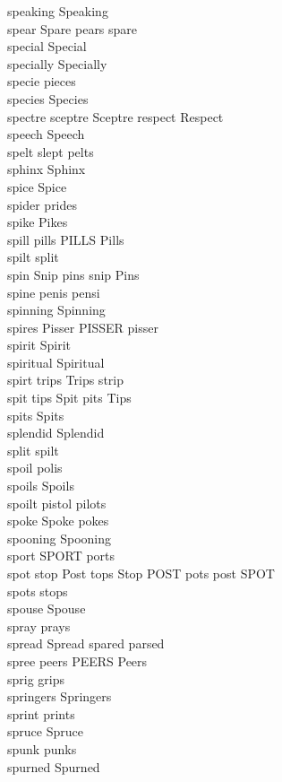 speaking Speaking\\
spear Spare pears spare\\
special Special\\
specially Specially\\
specie pieces\\
species Species\\
spectre sceptre Sceptre respect Respect\\
speech Speech\\
spelt slept pelts\\
sphinx Sphinx\\
spice Spice\\
spider prides\\
spike Pikes\\
spill pills PILLS Pills\\
spilt split\\
spin Snip pins snip Pins\\
spine penis pensi\\
spinning Spinning\\
spires Pisser PISSER pisser\\
spirit Spirit\\
spiritual Spiritual\\
spirt trips Trips strip\\
spit tips Spit pits Tips\\
spits Spits\\
splendid Splendid\\
split spilt\\
spoil polis\\
spoils Spoils\\
spoilt pistol pilots\\
spoke Spoke pokes\\
spooning Spooning\\
sport SPORT ports\\
spot stop Post tops Stop POST pots post SPOT\\
spots stops\\
spouse Spouse\\
spray prays\\
spread Spread spared parsed\\
spree peers PEERS Peers\\
sprig grips\\
springers Springers\\
sprint prints\\
spruce Spruce\\
spunk punks\\
spurned Spurned\\
